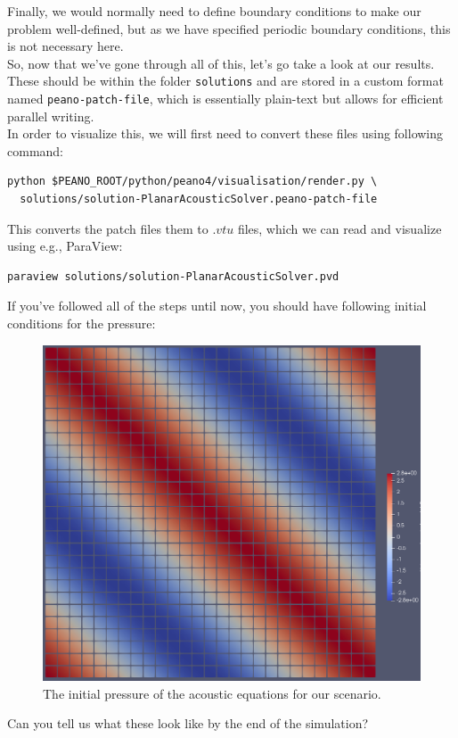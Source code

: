 \documentclass[12pt,letterpaper]{article}
\begin{document}
Finally, we would normally need to define boundary conditions to make our problem well-defined,
but as we have specified periodic boundary conditions, this is not necessary here.\\

So, now that we've gone through all of this, let's go take a look at our results.
These should be within the folder \texttt{solutions} and are stored in a custom format named \texttt{peano-patch-file},
which is essentially plain-text but allows for efficient parallel writing.\\
In order to visualize this, we will first need to convert these files using following command:\\

\begin{lstlisting}[style = Bash]
python $PEANO_ROOT/python/peano4/visualisation/render.py \
  solutions/solution-PlanarAcousticSolver.peano-patch-file
\end{lstlisting}

This converts the patch files them to $.vtu$ files, which we can read and visualize using e.g., ParaView:

\begin{lstlisting}[style = Bash]
paraview solutions/solution-PlanarAcousticSolver.pvd
\end{lstlisting}

If you've followed all of the steps until now, you should have following initial conditions for the pressure:

\begin{figure}[!h]
\centering
\includegraphics[width=0.60\linewidth]{PlanarAcoustic_initial.png}
\caption{The initial pressure of the acoustic equations for our scenario.}
\end{figure}

Can you tell us what these look like by the end of the simulation?
\end{document}
